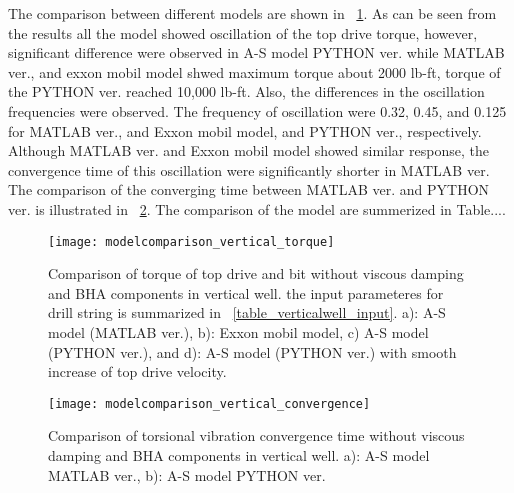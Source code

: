 The comparison between different models are shown in \figurename~\ref{figure_modelcomparison_vertical_torque}. As can be seen from the results all the model showed  oscillation of the top drive torque, however, significant difference were observed in A-S model PYTHON ver. while MATLAB ver., and exxon mobil model shwed maximum torque about 2000 lb-ft, torque of the PYTHON ver. reached 10,000 lb-ft. Also, the differences in the oscillation frequencies were observed. The frequency of oscillation were 0.32, 0.45, and 0.125 for MATLAB ver., and Exxon mobil model, and PYTHON ver., respectively. Although MATLAB ver. and Exxon mobil model showed similar response, the convergence time of this oscillation were significantly shorter in MATLAB ver. The comparison of the converging time between MATLAB ver. and PYTHON ver. is illustrated in \figurename~\ref{figure_modelcomparison_vertical_convergence}. The comparison of the model are summerized in Table....

\begin{figure}[hbt!]
  \centering
  \texttt{[image: modelcomparison\_vertical\_torque]}
  \caption[Comparison of torque of top drive and bit without viscous damping and BHA components in vertical well]{Comparison of torque of top drive and bit without viscous damping and BHA components in vertical well. the input parameteres for drill string is summarized in \tablename~\ref{table_verticalwell_input}. a): A-S model (MATLAB ver.), b): Exxon mobil model, c) A-S model (PYTHON ver.), and d): A-S model (PYTHON ver.) with smooth increase of top drive velocity.}\label{figure_modelcomparison_vertical_torque}
\end{figure}

\begin{figure}
  \centering
  \texttt{[image: modelcomparison\_vertical\_convergence]}
  \caption[Comparison of torsional vibration convergence time without viscous damping and BHA components in vertical well.]{Comparison of torsional vibration convergence time without viscous damping and BHA components in vertical well. a): A-S model MATLAB ver., b): A-S model PYTHON ver.}\label{figure_modelcomparison_vertical_convergence}
\end{figure}

